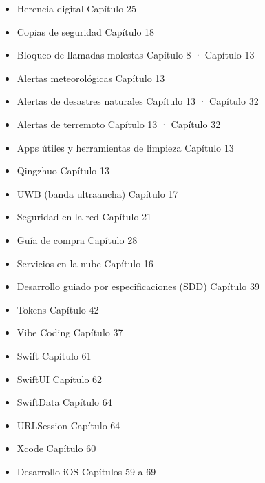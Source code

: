 \begin{itemize}
  \item Herencia digital Capítulo 25
  \item Copias de seguridad Capítulo 18
  \item Bloqueo de llamadas molestas Capítulo 8 · Capítulo 13
  \item Alertas meteorológicas Capítulo 13
  \item Alertas de desastres naturales Capítulo 13 · Capítulo 32
  \item Alertas de terremoto Capítulo 13 · Capítulo 32
  \item Apps útiles y herramientas de limpieza Capítulo 13
  \item Qingzhuo Capítulo 13
  \item UWB (banda ultraancha) Capítulo 17
  \item Seguridad en la red Capítulo 21
  \item Guía de compra Capítulo 28
  \item Servicios en la nube Capítulo 16
  \item Desarrollo guiado por especificaciones (SDD) Capítulo 39
  \item Tokens Capítulo 42
  \item Vibe Coding Capítulo 37
  \item Swift Capítulo 61
  \item SwiftUI Capítulo 62
  \item SwiftData Capítulo 64
  \item URLSession Capítulo 64
  \item Xcode Capítulo 60
  \item Desarrollo iOS Capítulos 59 a 69
\end{itemize}


